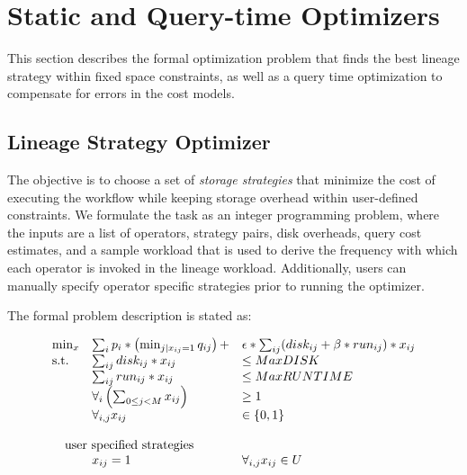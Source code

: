 \section{Static and Query-time Optimizers}
\label{s:costmodel}

This section describes the formal optimization problem that finds the best
lineage strategy within fixed space constraints, as well as a query time
optimization to compensate for errors in the cost models.  




\subsection{Lineage Strategy Optimizer}


The objective is to choose a set of {\it storage strategies} that minimize the
cost of executing the workflow while keeping storage overhead within
user-defined constraints.  We formulate the task as an integer programming
problem, where the inputs are a list of operators, strategy pairs, disk
overheads, query cost estimates, and a sample workload that is used to derive
the frequency with which each operator is invoked in the lineage workload.
Additionally, users can manually specify operator specific strategies prior to
running the optimizer. 


The formal problem description is stated as:

{\footnotesize
\[
\begin{array}{l l l}
\min_x          & \sum_i p_i * \left(\min_{j|x_{ij}=1} q_{ij}\right) +
&\epsilon * \sum_{ij} (disk_{ij} + \beta * run_{ij}) * x_{ij} \\
\mbox{s.t.}   &\sum_{ij} disk_{ij} * x_{ij} &\leq MaxDISK\\
              &\sum_{ij} run_{ij} * x_{ij} &\leq MaxRUNTIME\\
              &\forall_{i} \left(\sum_{0 \leq j < M} x_{ij}\right) &\ge 1\\
              &\forall_{i,j} x_{ij} &\in \{0, 1\} \\
&&\\
              &\hspace*{-.3in}  {\rm user\ specified\ strategies}&\\
              &x_{ij} = 1 &\forall_{i,j} x_{ij} \in U
\end{array}
\]
}

